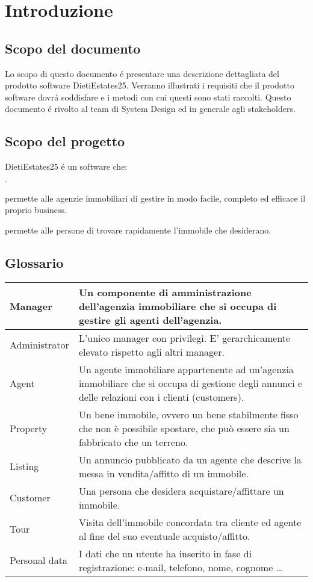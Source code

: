 \chapter{Introduzione}
\section{Scopo del documento}
Lo scopo di questo documento é presentare una descrizione dettagliata del 
prodotto software DietiEstates25. Verranno illustrati i requisiti che il 
prodotto software dovrá soddisfare e i metodi con cui questi sono stati raccolti.
Questo documento é rivolto al team di System Design ed in generale agli stakeholders. 

\section{Scopo del progetto}
DietiEstates25 é un software che:
\begin{list}{$\cdot$}{}
    \item permette alle agenzie immobiliari di gestire in modo facile,
    completo ed efficace il proprio business.
    \item permette alle persone di trovare rapidamente l'immobile 
    che desiderano.
\end{list}

\section{Glossario}
\begin{center}
\begin{tabular}{| m{8em} | m{8cm}|}
    \hline
    Manager & Un componente di amministrazione dell'agenzia immobiliare 
    che si occupa di gestire gli agenti dell'agenzia. \\
    \hline
    Administrator & L'unico manager con privilegi. E' gerarchicamente 
    elevato rispetto agli altri manager.
    \\
    \hline
    Agent & Un agente immobiliare appartenente ad un'agenzia immobiliare 
    che si occupa di gestione degli annunci e delle relazioni con i clienti (customers). \\
    \hline
    Property & Un bene immobile, ovvero un bene stabilmente fisso che non è 
    possibile spostare, che può essere sia un fabbricato che un terreno.\\
    \hline
    Listing & Un annuncio pubblicato da un agente che descrive la messa in 
    vendita/affitto di un immobile. \\
    \hline
    Customer & Una persona che desidera acquistare/affittare un immobile.\\
    \hline
    Tour & Visita dell'immobile concordata tra cliente ed agente al fine del 
    suo eventuale acquisto/affitto.\\
    \hline
    Personal data & I dati che un utente ha inserito in fase di registrazione: 
    e-mail, telefono, nome, cognome \dots \\
    \hline

\end{tabular}
\end{center}